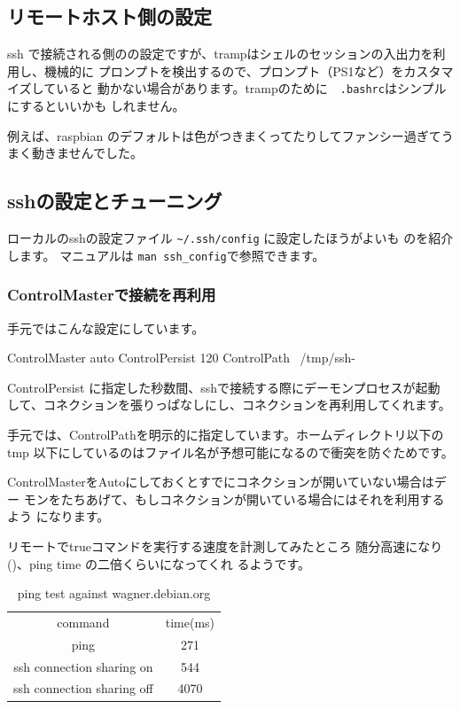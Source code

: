 \documentclass[mingoth,a4paper]{jsarticle}
\begin{document}
\subsection{リモートホスト側の設定}
ssh で接続される側のの設定ですが、trampはシェルのセッションの入出力を利用し、機械的に
プロンプトを検出するので、プロンプト（PS1など）をカスタマイズしていると
動かない場合があります。trampのために　\texttt{.bashrc}はシンプルにするといいかも
しれません。

例えば、raspbian のデフォルトは色がつきまくってたりしてファンシー過ぎてう
まく動きませんでした。

\subsection{sshの設定とチューニング}

ローカルのsshの設定ファイル \verb!~/.ssh/config! に設定したほうがよいも
のを紹介します。
マニュアルは \verb!man ssh_config!\cite{sshconfig}で参照できます。

\subsubsection{ControlMasterで接続を再利用}

手元ではこんな設定にしています。

\begin{commandline}
 ControlMaster auto
 ControlPersist 120
 ControlPath ~/tmp/ssh-%
\end{commandline}


ControlPersist に指定した秒数間、sshで接続する際にデーモンプロセスが起動
して、コネクションを張りっぱなしにし、コネクションを再利用してくれます。

手元では、ControlPathを明示的に指定しています。ホームディレクトリ以下の
tmp 以下にしているのはファイル名が予想可能になるので衝突を防ぐためです。

ControlMasterをAutoにしておくとすでにコネクションが開いていない場合はデー
モンをたちあげて、もしコネクションが開いている場合にはそれを利用するよう
になります。

リモートでtrueコマンドを実行する速度を計測してみたところ
随分高速になり()、ping time の二倍くらいになってくれ
るようです。

\begin{table}[ht]
\begin{center}
  \begin{tabular}{|c|c|}
   command & time(ms) \\
   ping& 271 \\
   ssh connection sharing on & 544 \\
   ssh connection sharing off & 4070 \\
 \end{tabular}
 \caption{ping test against wagner.debian.org}
 \label{fig:pingwagner}
\end{center}
\end{table}
\end{document}
